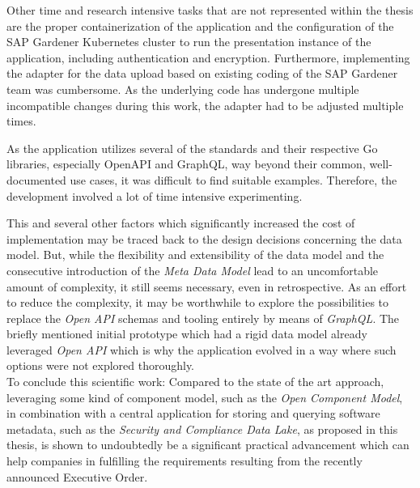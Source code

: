 Other time and research intensive tasks that are not represented within the thesis are the proper containerization of the application and the configuration of the SAP Gardener Kubernetes cluster to run the presentation instance of the application, including authentication and encryption. Furthermore, implementing the adapter for the data upload based on existing coding of the SAP Gardener team was cumbersome. As the underlying code has undergone multiple incompatible changes during this work, the adapter had to be adjusted multiple times.\par
As the application utilizes several of the standards and their respective Go libraries, especially OpenAPI and GraphQL, way beyond their common, well-documented use cases, it was difficult to find suitable examples. Therefore, the development involved a lot of time intensive experimenting.\par
This and several other factors which significantly increased the cost of implementation may be traced back to the design decisions concerning the data model.  But, while the flexibility and extensibility of the data model and the consecutive introduction of the \emph{Meta Data Model} lead to an uncomfortable amount of complexity, it still seems necessary, even in retrospective. As an effort to reduce the complexity, it may be worthwhile to explore the possibilities to replace the \emph{Open API} schemas and tooling entirely by means of \emph{GraphQL}. The briefly mentioned initial prototype which had a rigid data model already leveraged \emph{Open API} which is why the application evolved in a way where such options were not explored thoroughly.\\

To conclude this scientific work: Compared to the state of the art approach, leveraging some kind of component model, such as the \emph{Open Component Model}, in combination with a central application for storing and querying software metadata, such as the \emph{Security and Compliance Data Lake}, as proposed in this thesis, is shown to undoubtedly be a significant practical advancement which can help companies in fulfilling the requirements resulting from the recently announced Executive Order. %

